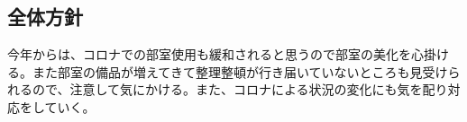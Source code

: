 \subsection*{全体方針}


今年からは、コロナでの部室使用も緩和されると思うので部室の美化を心掛ける。また部室の備品が増えてきて整理整頓が行き届いていないところも見受けられるので、注意して気にかける。また、コロナによる状況の変化にも気を配り対応をしていく。
